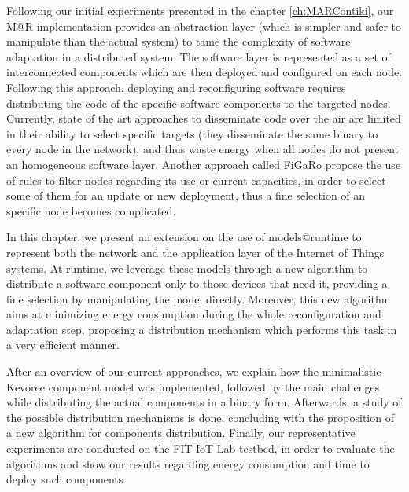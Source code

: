 Following our initial experiments presented in the chapter \ref{ch:MARContiki}, our M@R implementation provides an abstraction layer (which is simpler and safer to manipulate than the actual system) to tame the complexity of software adaptation in a distributed system. 
The software layer is represented as a set of interconnected components which are then deployed and configured on each node.
Following this approach, deploying and reconfiguring software requires distributing the code of the specific software components to the targeted nodes.
Currently, state of the art approaches to disseminate code over the air are limited in their ability to select specific targets (they disseminate the same binary to every node in the network\cite{hui2004dynamic}), and thus waste energy when all nodes do not present an homogeneous software layer.
Another approach called FiGaRo\cite{mottola2008figaro} propose the use of rules to filter nodes regarding its use or current capacities, in order to select some of them for an update or new deployment, thus a fine selection of an specific node becomes complicated.

In this chapter, we present an extension on the use of models@runtime to represent both the network and the application layer of the Internet of Things systems.
At runtime, we leverage these models through a new algorithm to distribute a software component only to those devices that need it, providing a fine selection by manipulating the model directly.
Moreover, this new algorithm aims at minimizing energy consumption during the whole reconfiguration and adaptation step, proposing a distribution mechanism which performs this task in a very efficient manner.

After an overview of our current approaches,  we explain how the minimalistic Kevoree component model was implemented, followed by the main challenges while distributing the actual components in a binary form.
Afterwards, a study of the possible distribution mechanisms is done, concluding with the proposition of a new algorithm for components distribution.
Finally, our representative experiments are conducted on the FIT-IoT Lab testbed, in order to evaluate the algorithms and show our results regarding energy consumption and time to deploy such components.


